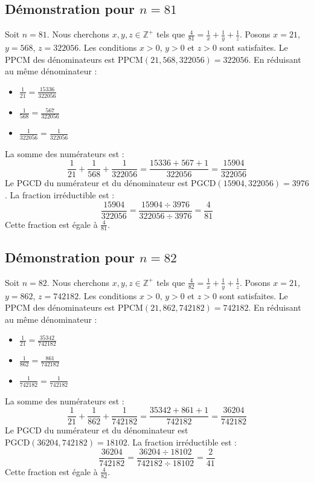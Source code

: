 \documentclass[11pt,a4paper]{article}
\begin{document}
\subsection{Démonstration pour $n = 81$}
Soit $n = 81$. Nous cherchons $x, y, z \in \mathbb{Z}^{+}$ tels que $\frac{4}{81} = \frac{1}{x} + \frac{1}{y} + \frac{1}{z}$.
Posons $x = 21$, $y = 568$, $z = 322056$.
Les conditions $x > 0$, $y > 0$ et $z > 0$ sont satisfaites.
Le PPCM des dénominateurs est $\text{PPCM}(21, 568, 322056) = 322056$.
En réduisant au même dénominateur :
\begin{itemize}
    \item $\frac{1}{21} = \frac{15336}{322056}$
    \item $\frac{1}{568} = \frac{567}{322056}$
    \item $\frac{1}{322056} = \frac{1}{322056}$
\end{itemize}
La somme des numérateurs est :
$$ \frac{1}{21} + \frac{1}{568} + \frac{1}{322056} = \frac{15336 + 567 + 1}{322056} = \frac{15904}{322056} $$
Le PGCD du numérateur et du dénominateur est $\text{PGCD}(15904, 322056) = 3976$.
La fraction irréductible est :
$$ \frac{15904}{322056} = \frac{15904 \div 3976}{322056 \div 3976} = \frac{4}{81} $$
Cette fraction est égale à $\frac{4}{81}$.

\subsection{Démonstration pour $n = 82$}
Soit $n = 82$. Nous cherchons $x, y, z \in \mathbb{Z}^{+}$ tels que $\frac{4}{82} = \frac{1}{x} + \frac{1}{y} + \frac{1}{z}$.
Posons $x = 21$, $y = 862$, $z = 742182$.
Les conditions $x > 0$, $y > 0$ et $z > 0$ sont satisfaites.
Le PPCM des dénominateurs est $\text{PPCM}(21, 862, 742182) = 742182$.
En réduisant au même dénominateur :
\begin{itemize}
    \item $\frac{1}{21} = \frac{35342}{742182}$
    \item $\frac{1}{862} = \frac{861}{742182}$
    \item $\frac{1}{742182} = \frac{1}{742182}$
\end{itemize}
La somme des numérateurs est :
$$ \frac{1}{21} + \frac{1}{862} + \frac{1}{742182} = \frac{35342 + 861 + 1}{742182} = \frac{36204}{742182} $$
Le PGCD du numérateur et du dénominateur est $\text{PGCD}(36204, 742182) = 18102$.
La fraction irréductible est :
$$ \frac{36204}{742182} = \frac{36204 \div 18102}{742182 \div 18102} = \frac{2}{41} $$
Cette fraction est égale à $\frac{4}{82}$.
\end{document}

